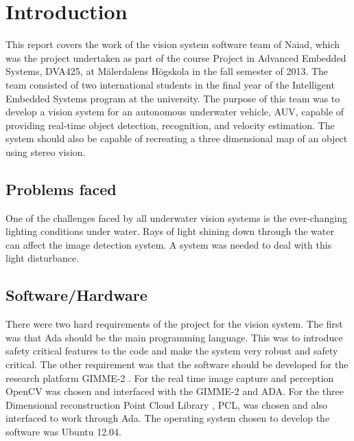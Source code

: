 \section{Introduction}\label{sec:introduction}
This report covers the work of the vision system software team of Naiad, which was the project undertaken as part of the course Project in Advanced Embedded Systems, DVA425, at M\"{a}lerdalens H\"{o}gskola in the fall semester of 2013. The team consisted of two international students in the final year of the Intelligent Embedded Systems program at the university.
The purpose of this team was to develop a vision system for an autonomous underwater vehicle, AUV, capable of providing real-time object detection, recognition, and velocity estimation. The system should also be capable of recreating a three dimensional map of an object using stereo vision.

\subsection{Problems faced}
One of the challenges faced by all underwater vision systems is the ever-changing lighting conditions under water. Rays of light shining down through the water can affect the image detection system. A system was needed to deal with this light disturbance.

\subsection{Software/Hardware}
There were two hard requirements of the project for the vision system. The first was that Ada should be the main programming language. This was to introduce safety critical features to the code and make the system very robust and safety critical. The other requirement was that the software should be developed for the research platform GIMME-2 \cite{web:GIMME2}. 
For the real time image capture and perception OpenCV \cite{web:OpenCV} was chosen and interfaced with the GIMME-2 and ADA. For the three Dimensional reconstruction Point Cloud Library \cite{web:PCL}, PCL, was chosen and also interfaced to work through Ada. The operating system chosen to develop the software was Ubuntu 12.04.

